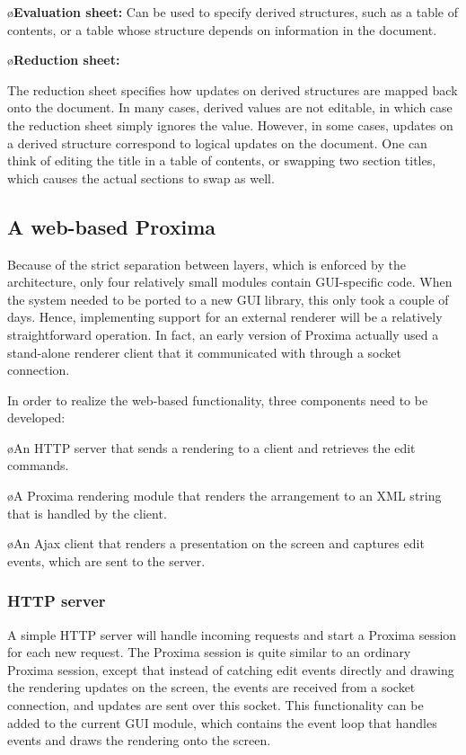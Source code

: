 \documentclass[10pt]{article}
\begin{document}
\bl
\o{\bf Evaluation sheet:}
Can be used to specify derived structures, such as a table of contents, or a table whose structure depends on information in the document. 

\o{\bf Reduction sheet:}

The reduction sheet specifies how updates on derived structures are mapped back onto the document. In many cases, derived values are not editable, in which case the reduction sheet simply ignores the value. However, in some cases, updates on a derived structure correspond to logical updates on the document. One can think of editing the title in a table of contents, or swapping two section titles, which causes the actual sections to swap as well. 
\el


\subsection{A web-based Proxima}


Because of the strict separation between layers, which is enforced by the architecture, 
only four relatively small modules contain GUI-specific code. When the system needed to be ported to a new GUI library, this only took a couple of days. Hence, implementing support for an external renderer will be a relatively straightforward operation. In fact, an early version of Proxima actually used a stand-alone renderer client that it communicated with through a socket connection.

In order to realize the web-based functionality, three components need to be developed:

\bl
\o An HTTP server that sends a rendering to a client and retrieves the edit commands. 

\o A Proxima rendering module that renders the arrangement to an XML string that is handled by the client.

\o An Ajax client that renders a presentation on the screen and captures edit events, which are sent to the server.
\el

\subsubsection{HTTP server}

A simple HTTP server will handle incoming requests and start a Proxima session for each new request. The Proxima session is quite similar to an ordinary Proxima session, except that instead of catching edit events directly and drawing the rendering updates on the screen, the events are received from a socket connection, and updates are sent over  this socket. This functionality can be added to the current GUI module, which contains the event loop that handles events and draws the rendering onto the screen. 
 
\end{document}
